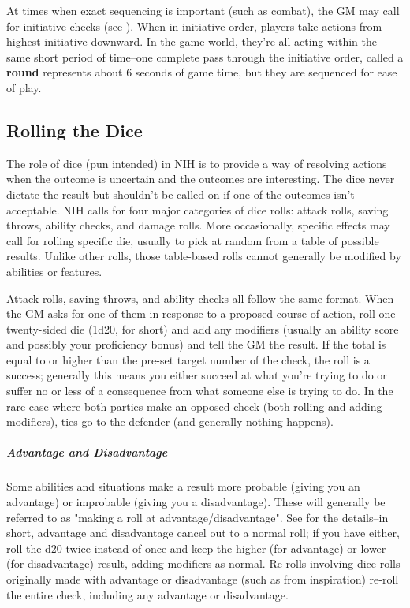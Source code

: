 At times when exact sequencing is important (such as combat), the GM may call for initiative checks (see ). When in initiative order, players take actions from highest initiative downward. In the game world, they're all acting within the same short period of time--one complete pass through the initiative order, called a \textbf{round} represents about 6 seconds of game time, but they are sequenced for ease of play.

\subsection{Rolling the Dice}
The role of dice (pun intended) in NIH is to provide a way of resolving actions when the outcome is uncertain and the outcomes are interesting. The dice never dictate the result but shouldn't be called on if one of the outcomes isn't acceptable. NIH calls for four major categories of dice rolls: attack rolls, saving throws, ability checks, and damage rolls. More occasionally, specific effects may call for rolling specific die, usually to pick at random from a table of possible results. Unlike other rolls, those table-based rolls cannot generally be modified by abilities or features.

Attack rolls, saving throws, and ability checks all follow the same format. When the GM asks for one of them in response to a proposed course of action, roll one twenty-sided die (1d20, for short) and add any modifiers (usually an ability score and possibly your proficiency bonus) and tell the GM the result. If the total is equal to or higher than the pre-set target number of the check, the roll is a success; generally this means you either succeed at what you're trying to do or suffer no or less of a consequence from what someone else is trying to do. In the rare case where both parties make an opposed check (both rolling and adding modifiers), ties go to the defender (and generally nothing happens).

\subparagraph*{Advantage and Disadvantage} Some abilities and situations make a result more probable (giving you an advantage) or improbable (giving you a disadvantage). These will generally be referred to as "making a roll at advantage/disadvantage". See  for the details--in short, advantage and disadvantage cancel out to a normal roll; if you have either, roll the d20 twice instead of once and keep the higher (for advantage) or lower (for disadvantage) result, adding modifiers as normal. Re-rolls involving dice rolls originally made with advantage or disadvantage (such as from inspiration) re-roll the entire check, including any advantage or disadvantage.


